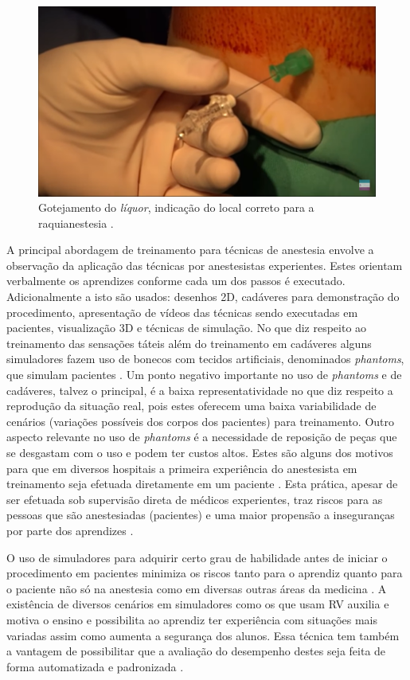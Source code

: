 \begin{figure}[!ht]
   \centering
   \includegraphics[width=0.6\linewidth]{capitulos/figuras/3.GotejamentoLiquor.png}
   \caption{Gotejamento do \textit{líquor}, indicação do local correto para a raquianestesia \cite{Londero2018}.}
   \label{fig:gotejamentoLiquor}
\end{figure}

A principal abordagem de treinamento para técnicas de anestesia envolve a observação da aplicação das técnicas por anestesistas experientes. Estes orientam verbalmente os aprendizes conforme cada um dos passos é executado. Adicionalmente a isto são usados: desenhos 2D, cadáveres para demonstração do procedimento, apresentação de vídeos das técnicas sendo executadas em pacientes, visualização 3D e técnicas de simulação. No que diz respeito ao treinamento das sensações táteis além do treinamento em cadáveres alguns simuladores fazem uso de bonecos com tecidos artificiais, denominados \textit{phantoms}, que simulam pacientes \cite{Dreifaldt2006}. Um ponto negativo importante no uso de \textit{phantoms} e de cadáveres, talvez o principal, é a baixa representatividade no que diz respeito a reprodução da situação real, pois estes oferecem uma baixa variabilidade de cenários (variações possíveis dos corpos dos pacientes) para treinamento.  Outro aspecto relevante no uso de \textit{phantoms} é a necessidade de reposição de peças que se desgastam com o uso e podem ter custos altos. Estes são alguns dos motivos para que em diversos hospitais a primeira experiência do anestesista em treinamento seja efetuada diretamente em um paciente \cite{Aggarwal2009, Grantcharov2008, Smith2005, Watterson2007}. Esta prática, apesar de ser efetuada sob supervisão direta de médicos experientes, traz riscos para as pessoas que são anestesiadas (pacientes) e uma maior propensão a inseguranças por parte dos aprendizes \cite{Elmofty2017}. 

O uso de simuladores para adquirir certo grau de habilidade antes de iniciar o procedimento em pacientes minimiza os riscos tanto para o aprendiz quanto para o paciente não só na anestesia \cite{Escobar-Castillejos2016, Yunoki2018} como em diversas outras áreas da medicina \cite{Akhtar2014, Alvarez-Lopez2020, Hamm2022}. A existência de diversos cenários em simuladores como os que usam \acrfull{RV} auxilia e motiva o ensino e possibilita ao aprendiz ter experiência com situações mais variadas assim como aumenta a segurança dos alunos. Essa técnica tem também a vantagem de possibilitar que a avaliação do desempenho destes seja feita de forma automatizada e padronizada \cite{Willis2014}. 

